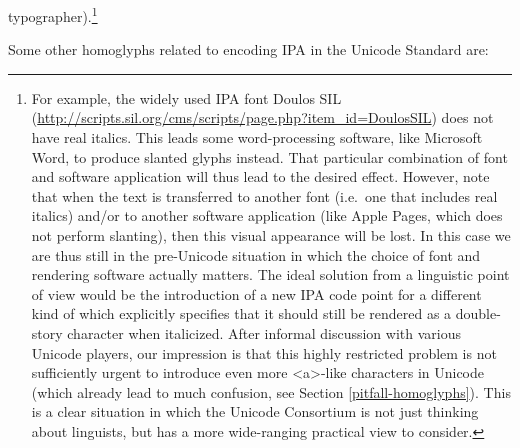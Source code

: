 typographer).\footnote{For example, the widely used IPA font Doulos SIL
(\url{http://scripts.sil.org/cms/scripts/page.php?item\_id=DoulosSIL}) does not
have real italics. This leads some word-processing software, like Microsoft
Word, to produce slanted glyphs instead. That particular combination of font and
software application will thus lead to the desired effect. However, note that
when the text is transferred to another font (i.e.~one that includes real
italics) and/or to another software application (like Apple Pages, which does
not perform slanting), then this visual appearance will be lost. In this case we
are thus still in the pre-Unicode situation in which the choice of font and
rendering software actually matters. The ideal solution from a linguistic point
of view would be the introduction of a new IPA code point for a different kind
of which explicitly specifies that it should still be rendered as a double-story
character when italicized. After informal discussion with various Unicode
players, our impression is that this highly restricted problem is not
sufficiently urgent to introduce even more <a>-like characters in Unicode (which
already lead to much confusion, see Section \ref{pitfall-homoglyphs}). This is a
clear situation in which the Unicode Consortium is not just thinking about
linguists, but has a more wide-ranging practical view to consider.}

Some other homoglyphs related to encoding IPA in the Unicode Standard are:

